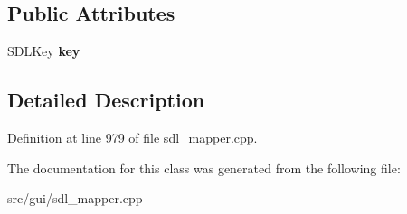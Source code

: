 \subsection*{Public Attributes}
\begin{DoxyCompactItemize}
\item 
\hypertarget{classCKeyBind_a5db2e06f00521cdcd4bdf961cb02c336}{S\-D\-L\-Key {\bfseries key}}\label{classCKeyBind_a5db2e06f00521cdcd4bdf961cb02c336}

\end{DoxyCompactItemize}


\subsection{Detailed Description}


Definition at line 979 of file sdl\-\_\-mapper.\-cpp.



The documentation for this class was generated from the following file\-:\begin{DoxyCompactItemize}
\item 
src/gui/sdl\-\_\-mapper.\-cpp\end{DoxyCompactItemize}
